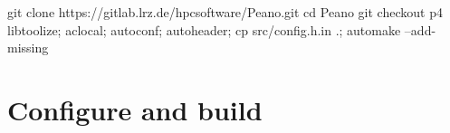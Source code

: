 \begin{code}
 git clone https://gitlab.lrz.de/hpcsoftware/Peano.git
 cd Peano
 git checkout p4
 libtoolize; aclocal; autoconf; autoheader; cp src/config.h.in .; automake --add-missing
\end{code}

\section{Configure and build}





